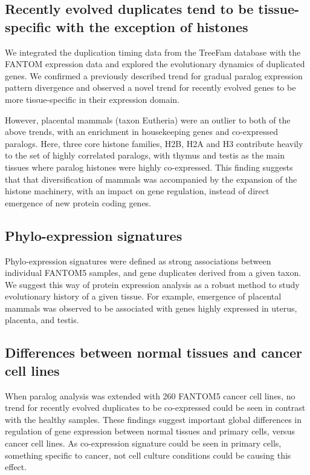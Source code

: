 \documentclass[11pt, a4paper,oneside]{report}
\begin{document}
\subsection{Recently evolved duplicates tend to be tissue-specific with the exception of histones}
We integrated the duplication timing data from the TreeFam database with the FANTOM expression data and explored the evolutionary dynamics of duplicated genes. We confirmed a previously described trend for gradual paralog expression pattern divergence and observed
a novel trend for recently evolved genes to be more tissue-specific in their expression domain.

However, placental mammals (taxon Eutheria) were an outlier to both of the above trends, with an enrichment in housekeeping genes and co-expressed paralogs. Here, three core histone families, H2B, H2A and H3 contribute heavily to the set of highly correlated paralogs, with thymus and testis as the main tissues where paralog histones were highly co-expressed. This finding suggests that that diversification of mammals was accompanied by the expansion of the  histone machinery, with an impact on gene regulation, instead of direct emergence of new protein coding genes. 

\subsection{Phylo-expression signatures}
Phylo-expression signatures were defined as strong associations between individual FANTOM5 samples, and gene duplicates derived from a given taxon. We suggest this way of protein expression analysis as a robust method to study evolutionary history of a given tissue. For example, emergence of placental mammals was observed to be associated with genes highly expressed in uterus, placenta, and testis.

\subsection{Differences between normal tissues and cancer cell lines}
When paralog analysis was extended with 260 FANTOM5 cancer cell lines, no trend for recently evolved duplicates to be co-expressed could be seen in contrast with the healthy samples. These findings suggest important global differences in regulation of gene expression between normal tissues and primary cells, versus cancer cell lines. As co-expression signature could be seen in primary cells, something specific to cancer, not cell culture conditions could be causing this effect.
\end{document}
